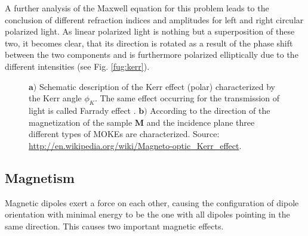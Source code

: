 \documentclass[a4paper]{scrartcl}
\numberwithin{equation}{section}
\numberwithin{figure}{section}
\numberwithin{table}{section}
\newcommand{\ve}[1]{\mathbf{ #1} }
\begin{document}
A further analysis of the Maxwell equation for this problem \cite{book} leads to the conclusion of different refraction indices and amplitudes for left and right circular polarized light. As linear polarized light is nothing but a superposition of these two, it becomes clear, that its direction is rotated as a result of the phase shift between the two components and is furthermore polarized elliptically due to the different intensities (see Fig. \ref{fug:kerr}).



\begin{figure} 
 \centering
{}
{}

\caption{
\small $\ve a)$ Schematic description of the Kerr effect (polar) characterized by the Kerr angle $\phi_K$. The same effect occurring for the transmission of light is called Farrady effect \cite{dissert}. $\ve b)$ According to the direction of the magnetization of the sample $\ve M$ and the incidence plane three different types of MOKEs are characterized. 
Source: \url{http://en.wikipedia.org/wiki/Magneto-optic_Kerr_effect}. } 
	\label{fig:kerr}
\end{figure}




\subsection{Magnetism}
Magnetic dipoles exert a force on each other, causing the configuration of dipole orientation with minimal energy to be the one with all dipoles pointing in the same direction. This causes two important magnetic effects.
\end{document}
